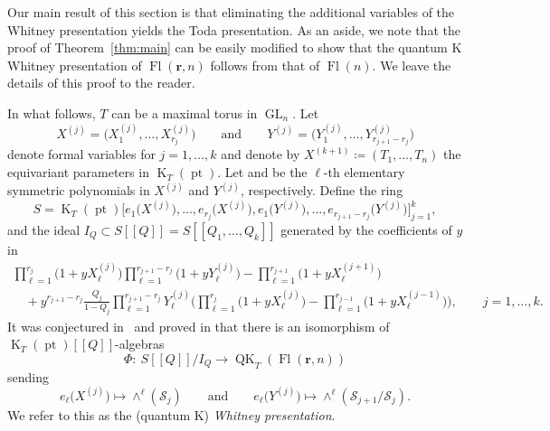 \documentclass[11pt]{article}
\numberwithin{equation}{section}
\numberwithin{equation}{section}
\theoremstyle{definition}
\newcommand{\br}[1]{\left(#1\right)}
\DeclareMathOperator{\GL}{GL}
\DeclareMathOperator{\Fl}{Fl}
\DeclareMathOperator{\QK}{QK}
\DeclareMathOperator{\K}{K}
\DeclareMathOperator{\pt}{pt}
\newcommand{\bfr}{{\mathbf r}}
\newcommand{\cS}{{\mathcal S}}
\begin{document}
Our main result of this section is that eliminating the additional variables of the Whitney presentation yields the Toda presentation. As an aside, we note that the proof of Theorem~\ref{thm:main} can be easily modified to show that the quantum K Whitney presentation of $\Fl(\bfr,n)$ follows from that of $\Fl(n)$.
We leave the details of this proof to the reader.

In what follows, $T$ can be a maximal torus in $\GL_n$.
Let
\[
 {X}^{(j)}=\bigl(X^{(j)}_1,\dots,X^{(j)}_{r_j}\bigr) \qquad\text{and}\qquad {Y}^{(j)}=\bigl(Y^{(j)}_1,\dots,
Y^{(j)}_{r_{j+1}-r_j}\bigr)
\]
denote formal variables for $j=1,\dots,k$ and denote by $X^{(k+1)}\coloneqq (T_1,\dots,T_n)$ the equivariant parameters in $\K_T(\pt)$. Let  and  be the $\ell$-th elementary symmetric polynomials in ${X}^{(j)}$ and ${Y}^{(j)}$, respectively. Define the ring
 \[
 S=\K_T(\pt)\bigl[e_1\bigl(X^{(j)}\bigr),\dots, e_{r_j}\bigl(X^{(j)}\bigr),e_1\bigl(Y^{(j)}\bigr),\dots,e_{r_{j+1}-r_j}\bigl(Y^{(j)}\bigr)\bigr]_{j=1}^k ,
 \]
 and the ideal $I_Q\subset S[\![Q]\!]=S[\![Q_1,\dots,Q_k]\!]$
generated by the coefficients of $y$ in
\begin{gather}\label{eqn:qkrel}
 \prod_{\ell=1}^{r_j}\bigl(1+y X^{(j)}_\ell\bigr)\prod_{\ell=1}^{r_{j+1}-r_j}\bigl(1+y Y^{(j)}_\ell\bigr)-\prod_{\ell=1}^{r_{j+1}}\bigl(1+y X^{(j+1)}_\ell\bigr)\\
 \quad{}+y^{{r_{j+1}-r_j}}\frac{Q_j}{1-Q_j}\prod_{\ell=1}^{r_{j+1}-r_j}Y^{(j)}_\ell\Biggl(\prod_{\ell=1}^{r_j}\bigl(1+yX^{(j)}_\ell\bigr) -\prod_{\ell=1}^{r_{j-1}}\bigl(1+yX^{(j-1)}_\ell\bigr)\Biggr), \qquad j=1,\dots, k. \nonumber
\end{gather}
It was conjectured in~\cite{gu2023quantum,GMSXZZ:QKW} and proved in
\cite{huq2024quantum} that
there is an isomorphism of $\K_T(\pt)[\![Q]\!]$-algebras
 \begin{equation}\label{E:QKWhitney}
 \Phi\colon\ {S[\![Q]\!]}/I_Q\to \QK_T\br{\Fl(\bfr,n)}
 \end{equation}
 sending
 \[ e_\ell\bigl(X^{(j)}\bigr) \mapsto \wedge^\ell(\cS_{j}) \qquad \textrm{and} \qquad e_\ell\bigl(Y^{(j)}\bigr) \mapsto \wedge^\ell(\cS_{{j+1}}/\cS_{j}) . \]
 We refer to this as the (quantum K) {\em Whitney presentation}.
\end{document}
